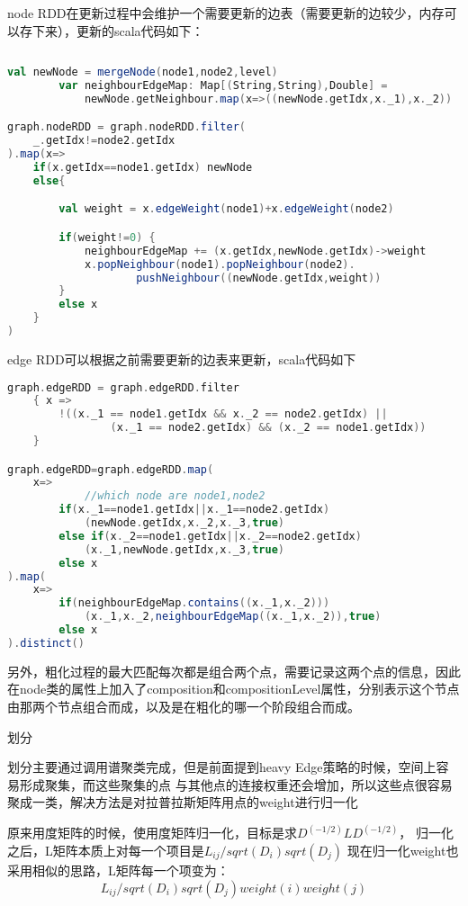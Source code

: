 node RDD在更新过程中会维护一个需要更新的边表（需要更新的边较少，内存可以存下来），更新的scala代码如下：

\begin{lstlisting}[language=Scala]
    
val newNode = mergeNode(node1,node2,level)
        var neighbourEdgeMap: Map[(String,String),Double] =
            newNode.getNeighbour.map(x=>((newNode.getIdx,x._1),x._2))

graph.nodeRDD = graph.nodeRDD.filter(
    _.getIdx!=node2.getIdx
).map(x=>
    if(x.getIdx==node1.getIdx) newNode
    else{

        val weight = x.edgeWeight(node1)+x.edgeWeight(node2)

        if(weight!=0) {
            neighbourEdgeMap += (x.getIdx,newNode.getIdx)->weight
            x.popNeighbour(node1).popNeighbour(node2).
                    pushNeighbour((newNode.getIdx,weight))
        }
        else x
    }
)
\end{lstlisting}

edge RDD可以根据之前需要更新的边表来更新，scala代码如下

\begin{lstlisting}[language=Scala]
graph.edgeRDD = graph.edgeRDD.filter
    { x =>
        !((x._1 == node1.getIdx && x._2 == node2.getIdx) ||
                (x._1 == node2.getIdx) && (x._2 == node1.getIdx))
    }

graph.edgeRDD=graph.edgeRDD.map(
    x=>
            //which node are node1,node2
        if(x._1==node1.getIdx||x._1==node2.getIdx)
            (newNode.getIdx,x._2,x._3,true)
        else if(x._2==node1.getIdx||x._2==node2.getIdx)
            (x._1,newNode.getIdx,x._3,true)
        else x
).map(
    x=>
        if(neighbourEdgeMap.contains((x._1,x._2)))
            (x._1,x._2,neighbourEdgeMap((x._1,x._2)),true)
        else x
).distinct()

\end{lstlisting}

另外，粗化过程的最大匹配每次都是组合两个点，需要记录这两个点的信息，因此在node类的属性上加入了composition和compositionLevel属性，分别表示这个节点由那两个节点组合而成，以及是在粗化的哪一个阶段组合而成。

划分

划分主要通过调用谱聚类完成，但是前面提到heavy Edge策略的时候，空间上容易形成聚集，而这些聚集的点
与其他点的连接权重还会增加，所以这些点很容易聚成一类，解决方法是对拉普拉斯矩阵用点的weight进行归一化

原来用度矩阵的时候，使用度矩阵归一化，目标是求$D^(-1/2)LD^(-1/2)$，
归一化之后，L矩阵本质上对每一个项目是$L_{ij}/sqrt(D_i)sqrt(D_j)$
现在归一化weight也采用相似的思路，L矩阵每一个项变为：
$$L_{ij}/sqrt(D_i)sqrt(D_j)weight(i)weight(j)$$

